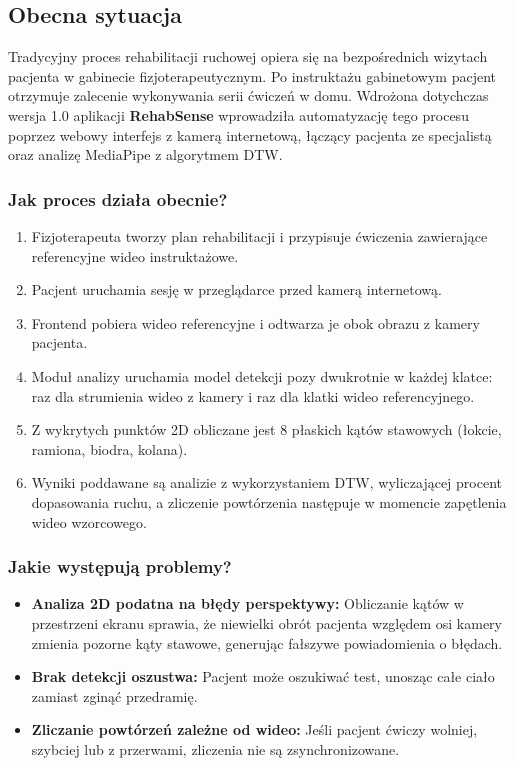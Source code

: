 \documentclass[11pt,a4paper]{article}
\newcommand{\sysname}{\textbf{RehabSense}}
\begin{document}
\subsection{Obecna sytuacja}
Tradycyjny proces rehabilitacji ruchowej opiera się na bezpośrednich wizytach pacjenta w gabinecie fizjoterapeutycznym. Po instruktażu gabinetowym pacjent otrzymuje zalecenie wykonywania serii ćwiczeń w domu. Wdrożona dotychczas wersja 1.0 aplikacji \sysname{} wprowadziła automatyzację tego procesu poprzez webowy interfejs z kamerą internetową, łączący pacjenta ze specjalistą oraz analizę MediaPipe z algorytmem DTW.

\subsubsection{Jak proces działa obecnie?}
\begin{enumerate}
    \item Fizjoterapeuta tworzy plan rehabilitacji i przypisuje ćwiczenia zawierające referencyjne wideo instruktażowe.
    \item Pacjent uruchamia sesję w przeglądarce przed kamerą internetową.
    \item Frontend pobiera wideo referencyjne i odtwarza je obok obrazu z kamery pacjenta.
    \item Moduł analizy uruchamia model detekcji pozy dwukrotnie w każdej klatce: raz dla strumienia wideo z kamery i raz dla klatki wideo referencyjnego.
    \item Z wykrytych punktów 2D obliczane jest 8 płaskich kątów stawowych (łokcie, ramiona, biodra, kolana).
    \item Wyniki poddawane są analizie z wykorzystaniem DTW, wyliczającej procent dopasowania ruchu, a zliczenie powtórzenia następuje w momencie zapętlenia wideo wzorcowego.
\end{enumerate}

\subsubsection{Jakie występują problemy?}
\begin{itemize}
    \item \textbf{Analiza 2D podatna na błędy perspektywy:} Obliczanie kątów w przestrzeni ekranu sprawia, że niewielki obrót pacjenta względem osi kamery zmienia pozorne kąty stawowe, generując fałszywe powiadomienia o błędach.
    \item \textbf{Brak detekcji oszustwa:} Pacjent może oszukiwać test, unosząc całe ciało zamiast zginąć przedramię.
    \item \textbf{Zliczanie powtórzeń zależne od wideo:} Jeśli pacjent ćwiczy wolniej, szybciej lub z przerwami, zliczenia nie są zsynchronizowane.
\end{itemize}
\end{document}
